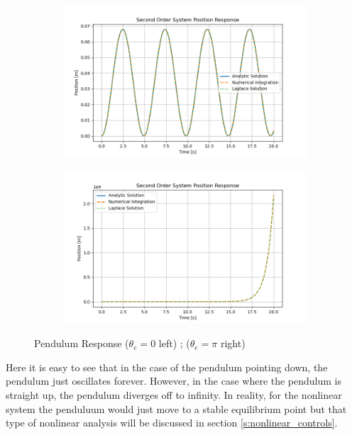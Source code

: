 \begin{figure}[H]
\centering
\begin{subfigure}[b]{0.48\textwidth}
\centering
\includegraphics[width=\linewidth]{Figures/pendulum_response_stable.png}
\end{subfigure}
\hfill
\begin{subfigure}[b]{0.48\textwidth}
\centering
\includegraphics[width=\linewidth]{Figures/pendulum_response_unstable.png}
\end{subfigure}
\caption{Pendulum Response ($\theta_e=0$ left) ; ($\theta_e=\pi$ right)}
\label{f:pendulum_response}
\end{figure}
Here it is easy to see that in the case of the pendulum pointing down, the pendulum just oscillates forever. However, in the case where the pendulum is straight up, the pendulum diverges off to infinity. In reality, for the nonlinear system the penduluum would just move to a stable equilibrium point but that type of nonlinear analysis will be discussed in section \ref{s:nonlinear_controls}.